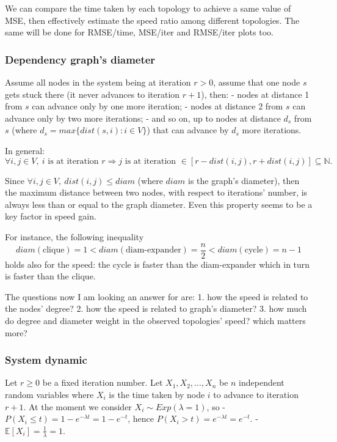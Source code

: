 \documentclass[11pt]{article}
\begin{document}
We can compare the time taken by each topology to achieve a same value
of MSE, then effectively estimate the speed ratio among different
topologies. The same will be done for RMSE/time, MSE/iter and RMSE/iter
plots too.

    \subsubsection{Dependency graph's
diameter}\label{dependency-graphs-diameter}

Assume all nodes in the system being at iteration \(r>0\), assume that
one node \(s\) gets stuck there (it never advances to iteration
\(r+1\)), then: - nodes at distance 1 from \(s\) can advance only by one
more iteration; - nodes at distance 2 from \(s\) can advance only by two
more iterations; - and so on, up to nodes at distance \(d_s\) from \(s\)
(where \(d_s = max\{dist(s, i) : i \in V\}\)) that can advance by
\(d_s\) more iterations.

In general: \[
\forall i,j \in V,\ i \text{ is at iteration }r \Rightarrow j \text{ is at iteration } \in [r-dist(i,j),r+dist(i,j)] \subseteq \mathbb{N}.
\]

Since \(\forall i,j \in V,\ dist(i,j) \leq diam\) (where \(diam\) is the
graph's diameter), then the maximum distance between two nodes, with
respect to iterations' number, is always less than or equal to the graph
diameter. Even this property seems to be a key factor in speed gain.

For instance, the following inequality
\[diam(\text{clique}) = 1 < diam(\text{diam-expander}) = \frac{n}{2} < diam(\text{cycle}) = n-1\]
holds also for the speed: the cycle is faster than the diam-expander
which in turn is faster than the clique.

The questions now I am looking an answer for are: 1. how the speed is
related to the nodes' degree? 2. how the speed is related to graph's
diameter? 3. how much do degree and diameter weight in the observed
topologies' speed? which matters more?

    \subsubsection{System dynamic}\label{system-dynamic}

Let \(r \geq 0\) be a fixed iteration number. Let \(X_1, X_2, ..., X_n\)
be \(n\) independent random variables where \(X_i\) is the time taken by
node \(i\) to advance to iteration \(r+1\). At the moment we consider
\(X_i \sim Exp(\lambda = 1)\), so -
\(P(X_i \leq t) = 1-e^{-\lambda t} = 1-e^{-t}\), hence
\(P(X_i > t) = e^{-\lambda t} = e^{-t}\). -
\(\mathbb{E}[X_i] = \frac{1}{\lambda} = 1\).
\end{document}
